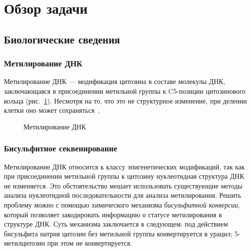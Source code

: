 
\section{Обзор задачи}

\subsection{Биологические сведения}

\subsubsection{Метилирование ДНК}

Метилирование ДНК --- модификация цитозина в составе молекулы
ДНК, заключающаяся в присоединении метильной группы к C5-позиции цитозинового кольца
(рис.~\ref{fig:methylation}). Несмотря на то, что это не структурное изменение, при
делении клетки оно может сохраняться~\cite{Jones2012}.

\begin{figure}[h]
  \begin{center}
    \begingroup
    \setatomsep{1.8em}
    \setchemrel{1pt}{0pt}{8.5em}
    \endgroup
  \end{center}
  \caption{Метилирование ДНК}
  \label{fig:methylation}
\end{figure}

\subsubsection{Бисульфитное секвенирование}

Метилирование ДНК относится к классу эпигенетических модификаций, так как при присоединении метильной
группы к цитозину нуклеотидная структура ДНК не изменяется. Это обстоятельство мешает использовать
существующие методы анализа нуклеотидной последовательности для анализа метилирования. Решить
проблему можно с помощью химического механизма \emph{бисульфитной конверсии}, который позволяет
закодировать информацию о статусе метилирования в структуре ДНК. Суть механизма заключается в
следующем: под действием бисульфита натрия цитозин без метильной группы конвертируется в урацил;
5\hyp метилцитозин при этом не конвертируется.

